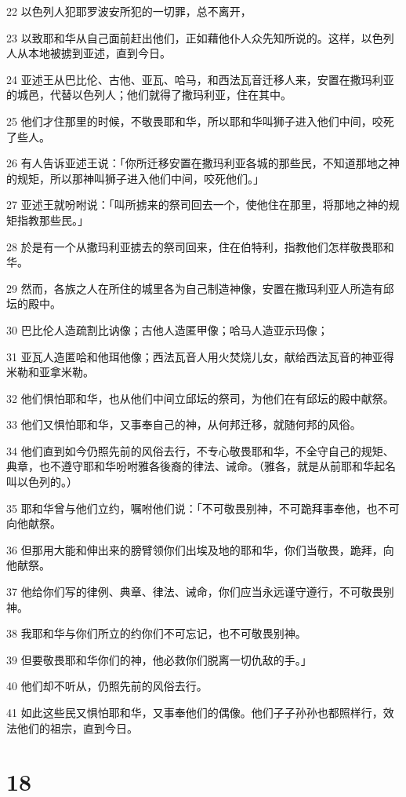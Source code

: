 \par 22 以色列人犯耶罗波安所犯的一切罪，总不离开，
\par 23 以致耶和华从自己面前赶出他们，正如藉他仆人众先知所说的。这样，以色列人从本地被掳到亚述，直到今日。
\par 24 亚述王从巴比伦、古他、亚瓦、哈马，和西法瓦音迁移人来，安置在撒玛利亚的城邑，代替以色列人；他们就得了撒玛利亚，住在其中。
\par 25 他们才住那里的时候，不敬畏耶和华，所以耶和华叫狮子进入他们中间，咬死了些人。
\par 26 有人告诉亚述王说：「你所迁移安置在撒玛利亚各城的那些民，不知道那地之神的规矩，所以那神叫狮子进入他们中间，咬死他们。」
\par 27 亚述王就吩咐说：「叫所掳来的祭司回去一个，使他住在那里，将那地之神的规矩指教那些民。」
\par 28 於是有一个从撒玛利亚掳去的祭司回来，住在伯特利，指教他们怎样敬畏耶和华。
\par 29 然而，各族之人在所住的城里各为自己制造神像，安置在撒玛利亚人所造有邱坛的殿中。
\par 30 巴比伦人造疏割比讷像；古他人造匿甲像；哈马人造亚示玛像；
\par 31 亚瓦人造匿哈和他珥他像；西法瓦音人用火焚烧儿女，献给西法瓦音的神亚得米勒和亚拿米勒。
\par 32 他们惧怕耶和华，也从他们中间立邱坛的祭司，为他们在有邱坛的殿中献祭。
\par 33 他们又惧怕耶和华，又事奉自己的神，从何邦迁移，就随何邦的风俗。
\par 34 他们直到如今仍照先前的风俗去行，不专心敬畏耶和华，不全守自己的规矩、典章，也不遵守耶和华吩咐雅各後裔的律法、诫命。（雅各，就是从前耶和华起名叫以色列的。）
\par 35 耶和华曾与他们立约，嘱咐他们说：「不可敬畏别神，不可跪拜事奉他，也不可向他献祭。
\par 36 但那用大能和伸出来的膀臂领你们出埃及地的耶和华，你们当敬畏，跪拜，向他献祭。
\par 37 他给你们写的律例、典章、律法、诫命，你们应当永远谨守遵行，不可敬畏别神。
\par 38 我耶和华与你们所立的约你们不可忘记，也不可敬畏别神。
\par 39 但要敬畏耶和华你们的神，他必救你们脱离一切仇敌的手。」
\par 40 他们却不听从，仍照先前的风俗去行。
\par 41 如此这些民又惧怕耶和华，又事奉他们的偶像。他们子子孙孙也都照样行，效法他们的祖宗，直到今日。

\chapter{18}

